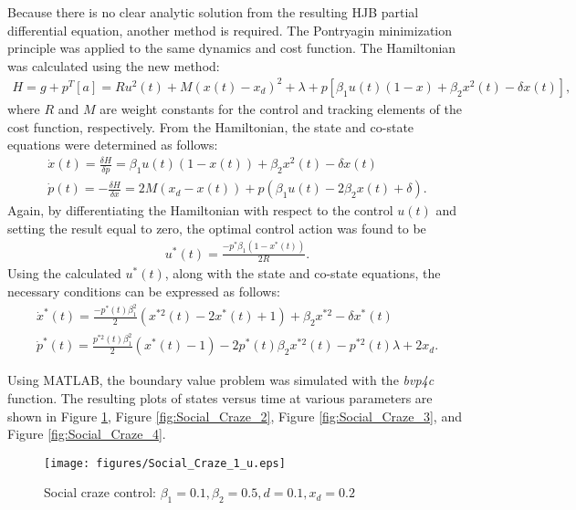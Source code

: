 Because there is no clear analytic solution from the resulting HJB partial differential equation, another method is required. The Pontryagin minimization principle was applied to the same dynamics and cost function. The Hamiltonian was calculated using the new method:
\begin{equation}
\left.\begin{aligned}
H = g + p^T[a] = Ru^2(t)+ M(x(t)-x_d)^2 + \lambda + p[\beta_1 u(t)(1-x) + \beta_2 x^2(t) - \delta x(t)],
\end{aligned}\right.
\end{equation}
\noindent where $R$ and $M$ are weight constants for the control and tracking elements of the cost function, respectively. From the Hamiltonian, the state and co-state equations were determined as follows:
\begin{equation}
\left.\begin{aligned}
\dot{x}(t) = \frac{\delta H}{\delta p} = \beta_1 u(t)(1-x(t)) + \beta_2 x^2(t) - \delta x(t)\\
\dot{p}(t) = -\frac{\delta H}{\delta x} = 2M(x_d - x(t)) + p(\beta_1 u(t) - 2 \beta_2 x(t) + \delta).
\end{aligned}\right.
\end{equation}
Again, by differentiating the Hamiltonian with respect to the control $u(t)$ and setting the result equal to zero, the optimal control action was found to be
\begin{equation}
\left.\begin{aligned}
u^*(t) = \frac{-p^* \beta_1(1-x^*(t))}{2R}.
\end{aligned}\right.
\end{equation}
Using the calculated $u^*(t)$, along with the state and co-state equations, the necessary conditions can be expressed as follows:
\begin{equation}
\left.\begin{aligned}
\dot{x}^*(t) = \frac{-p^*(t) \beta_1^2}{2}(x^{*2}(t)-2x^*(t)+1) +\beta_2 x^{*2} - \delta x^*(t)\\
\dot{p}^*(t) = \frac{p^{*2}(t) \beta_1^2}{2}(x^*(t) - 1) - 2p^*(t)\beta_2 x^{*2}(t) - p^{*2}(t) \lambda +2x_d.
\end{aligned}\right.
\end{equation}

Using MATLAB, the boundary value problem was simulated with the \textit{bvp4c} function. The resulting plots of states versus time at various parameters are shown in Figure \ref{fig:Social_Craze_1}, Figure \ref{fig:Social_Craze_2}, Figure \ref{fig:Social_Craze_3}, and Figure \ref{fig:Social_Craze_4}.
\begin{figure}[!htbp] \centering
  \texttt{[image: figures/Social\_Craze\_1\_u.eps]}
  \caption{Social craze control: $\beta_1=0.1,\beta_2=0.5,d=0.1,x_d=0.2$}
  \label{fig:Social_Craze_1}
\end{figure}

